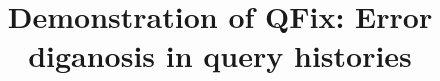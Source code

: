 


\newcommand{\papertext}[1]{#1}
\newcommand{\techreport}[1]{#1}

\newcommand{\alex}[1]{\noindent{\color{darkgreen}{Alexandra: #1}}}
\newcommand{\xlw}[1]{\noindent{\color{blue}{Xiaolan: #1}}}
\newcommand{\ewu}[1]{\noindent{\color{red}{EWu: #1}}}
\newcommand{\xxx}[1]{{\fontsize{13pt}{13pt}\selectfont\textcolor{red}{#1}}}
\newcommand{\codesize}{\fontsize{7}{8}}
\newcommand{\stitle}[1]{\vspace{0.5em}\noindent\textbf{#1}}
\newcommand{\calF}[0]{$\cal{F}$}

\newcommand{\ind}{\hspace{\algorithmicindent}}

\newcommand{\deprecate}[1]{\noindent{\color{light-gray}{#1}}}

\newcommand{\prob}{{\sc Log-Corruption}\xspace}
\newcommand{\exact}{{\sc EXACTSOL}\xspace}
\newcommand{\qfix}{{\sc SingleQueryFix}\xspace}
\newcommand{\density}{{\sc DENSITY}\xspace}


\newcommand{\milpall}{\textsc{MILP-NAIVE}\xspace}
\newcommand{\milptuple}{\textsc{MILP-COMPL}\xspace}
\newcommand{\milptuplestopearly}{\textsc{MILP-COMPL-STOPEARLY}\xspace}
\newcommand{\milpadvtuple}{\textsc{MILP-ADV-TUPLE}\xspace}
\newcommand{\milpadvall}{\textsc{MILP-ADV-ALL}\xspace}
\newcommand{\heurstic}{\textsc{HEURISTIC}\xspace}


\makeatletter
\def\maketag@@@#1{\hbox{\m@th\normalfont\normalsize#1}}
\DeclareRobustCommand*\textsubscript[1]{%
          \@textsubscript{\selectfont#1}}
        \def\@textsubscript#1{%
          {\m@th\ensuremath{_{\mbox{\fontsize\sf@size\z@#1}}}}}
\makeatother

\newcommand{\sysname}{\textsc{QueryFix}}
\newcommand{\sys}{QFix\xspace}
\newcommand{\naive}{\sysname\textsubscript{basic}\xspace}
\newcommand{\tslice}{\sysname\textsubscript{ts}\xspace}
\newcommand{\qslice}{\sysname\textsubscript{qs}\xspace}
\newcommand{\aslice}{\sysname\textsubscript{as}\xspace}
\newcommand{\incremental}{\sysname\textsubscript{inc}\xspace}



\title{{Demonstration of \LARGE\textbf{\sys}}: Error diganosis in query histories}

